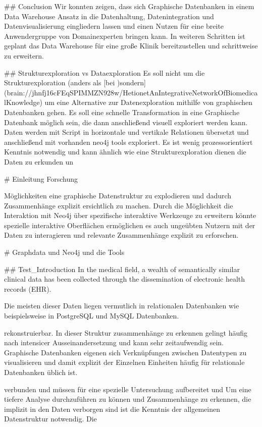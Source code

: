 ## Conclusion
Wir konnten zeigen, dass sich Graphische Datenbanken in einem Data Warehouse Ansatz in die Datenhaltung, Datenintegration und Datenvisualisierung eingliedern lassen und einen Nutzen für eine breite Anwendergruppe von Domainexperten bringen kann. In weiteren Schritten ist geplant das Data Warehouse für eine große Klinik bereitzustellen und schrittweise zu erweitern.


## Strukturexploration vs Dataexploration
Es soll nicht um die Strukturexploration (anders als [bei )sondern](brain://jhnfj16cFEqSPIMMZN928w/HetionetAnIntegrativeNetworkOfBiomedicalKnowledge) um eine Alternative zur Datenexploration mithilfe von graphischen Datenbanken gehen. Es soll eine schnelle Transformation in eine Graphische Datenbank möglich sein, die dann anschließend visuell exploriert werden kann. Daten werden mit Script in horizontale und vertikale Relationen übersetzt und anschließend mit vorhanden neo4j tools exploriert. Es ist wenig prozessorientiert Kenntnis notwendig und kann ähnlich wie eine Strukturexploration dienen die Daten zu erkunden un



# Einleitung Forschung

Möglichkeiten eine graphische Datenstruktur zu explodieren und dadurch Zusammenhänge explizit ersichtlich zu machen. Durch die Möglichkeit die Interaktion mit Neo4j über spezifische interaktive Werkzeuge zu erweitern könnte  spezielle interaktive Oberflächen ermöglichen es auch ungeübten Nutzern mit der Daten zu interagieren und relevante Zusammenhänge explizit zu erforschen. 

# Graphdata und Neo4j und die Tools




## Test_Introduction
In the medical field, a wealth of semantically similar clinical data has been collected through the dissemination of electronic health records (EHR). 

Die meisten dieser Daten liegen vermutlich in relationalen Datenbanken wie beispielsweise in PostgreSQL und MySQL Datenbanken.



rekonstruierbar. In dieser Struktur zusammenhänge zu erkennen gelingt häufig nach intensicer Ausseinandersetzung und kann sehr zeitaufwendig sein. Graphische Datenbanken eigenen sich Verknüpfungen zwischen Datentypen zu visualisieren und damit explizit der Einzelnen Einheiten häufig  für relationale Datenbanken üblich ist. 

verbunden und müssen für eine spezielle Untersuchung aufbereitet und  Um eine tiefere Analyse durchzuführen zu können und Zusammenhänge zu erkennen, die implizit in den Daten verborgen sind ist die Kenntnis der allgemeinen Datenstruktur notwendig. Die

